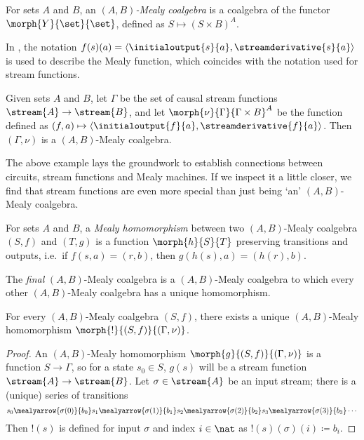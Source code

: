\begin{definition}
    For sets \(A\) and \(B\), an \emph{\((A,B)\)-Mealy coalgebra} is a coalgebra
    of the functor \(\morph{Y}{\set}{\set}\), defined as
    \(S \mapsto (S \times B)^A\).
\end{definition}

\begin{example}
    In \cite{bonsangue2008coalgebraic}, the notation \(
    f(s)(a) = \langle{\initialoutput{s}{a},\streamderivative{s}{a}}\rangle
    \) is used to describe the Mealy function, which coincides with the notation
    used for stream functions.

    Given sets \(A\) and \(B\), let \(\Gamma\) be the set of causal stream
    functions \(\stream{A} \to \stream{B}\), and let
    \(\morph{\nu}{\Gamma}{\Gamma \times B}^A\) be the function defined as \(
    (f, a) \mapsto \langle{\initialoutput{f}{a},\streamderivative{f}{a}}\rangle
    \).
    Then \((\Gamma,\nu)\) is a \((A,B)\)-Mealy coalgebra.
\end{example}

The above example lays the groundwork to establish connections between circuits,
stream functions and Mealy machines.
If we inspect it a little closer, we find that stream functions are even more
special than just being `an' \((A,B)\)-Mealy coalgebra.

\begin{definition}\label{def:mealy-homomorphism}
    For sets \(A\) and \(B\), a \emph{Mealy homomorphism} between two
    \((A,B)\)-Mealy coalgebra \((S,f)\) and \((T,g)\) is a function
    \(\morph{h}{S}{T}\) preserving transitions and
    outputs, i.e.\ if \(f(s,a) = (r,b)\), then \(g(h(s),a) = (h(r),b)\).
\end{definition}

The \emph{final} \((A,B)\)-Mealy coalgebra is a \((A,B)\)-Mealy coalgebra to
which every other \((A,B)\)-Mealy coalgebra has a unique homomorphism.

\begin{proposition}
    \label{prop:final-coalgebra}
    For every \((A,B)\)-Mealy coalgebra \((S,f)\), there exists a
    unique \((A,B)\)-Mealy homomorphism \(\morph{{!}}{(S,f)}{(\Gamma,\nu)}\).
\end{proposition}
\begin{proof}
    An \((A,B)\)-Mealy homomorphism \(\morph{g}{(S, f)}{(\Gamma, \nu)}\) is a
    function \(S \to \Gamma\), so for a state \(s_0 \in S\), \(g(s)\) will be a
    stream function \(\stream{A} \to \stream{B}\).
    Let \(\sigma \in \stream{A}\) be an input stream; there is a (unique) series
    of transitions \[
        s_0
        \mealyarrow{\sigma(0)}{b_0}
        s_1
        \mealyarrow{\sigma(1)}{b_1}
        s_2
        \mealyarrow{\sigma(2)}{b_2}
        s_3
        \mealyarrow{\sigma(3)}{b_3}
        \cdots
    \]
    Then \(!(s)\) is defined for input \(\sigma\) and
    index \(i \in \nat\) as \(!(s)(\sigma)(i) \coloneqq b_i\).
\end{proof}

